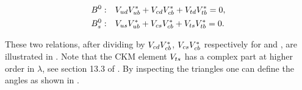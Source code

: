 \begin{subequations}
  \centering
  \label{unitConstraints}
  \begin{align}
    \Bd : & \quad \Vud\Vub^* + \Vcd\Vcb^* + \Vtd\Vtb^* = 0,
    \label{unitConstraints_Bd} \\
    \Bs : & \quad \Vus\Vub^* + \Vcs\Vcb^* + \Vts\Vtb^* = 0.
    \label{unitConstraints_Bs}
  \end{align}
\end{subequations}

\noindent These two relations, after dividing by $V_{cd}V_{cb}^*$, $V_{cs}V_{cb}^*$ respectively for \Bd and \Bs,
are illustrated in . Note that the CKM element $V_{ts}$ has a complex part at higher
order in $\lambda$, see section 13.3 of \cite{PDG}. By inspecting the triangles one can define the angles
as shown in .

